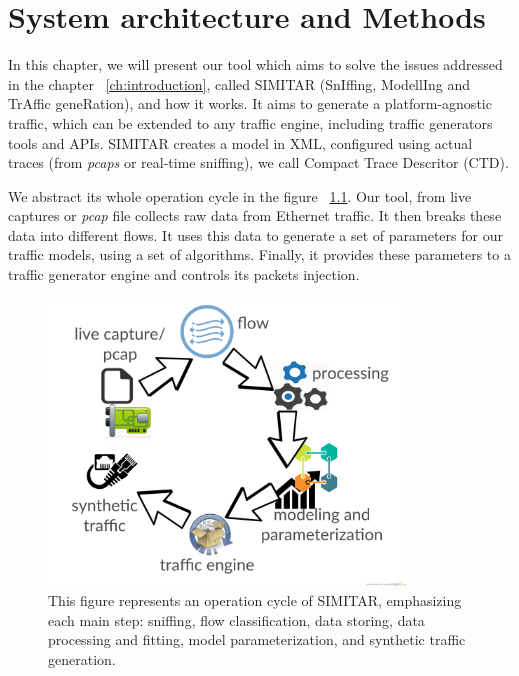 \chapter{System architecture and Methods}\label{ch:architecture}

In this chapter, we will present our tool which aims to solve the issues addressed in the chapter ~\ref{ch:introduction}, called SIMITAR (SnIffing, ModellIng and TrAffic geneRation), and how it works. It aims to generate a platform-agnostic traffic, which can be extended to any traffic engine, including traffic generators tools and APIs. SIMITAR creates a  model in XML, configured using actual traces (from \textit{pcaps} or real-time sniffing), we call Compact Trace Descritor (CTD). 



We abstract its whole operation cycle in the figure ~\ref{fig:cycle-of-operation}. Our tool, from live captures or \textit{pcap} file collects raw data from Ethernet traffic. It then breaks these data into different flows. It uses this data to generate a set of parameters for our traffic models, using a set of algorithms. Finally, it provides these parameters to a traffic generator engine and controls its packets injection.

\begin{figure}[ht!]
        \centering
        \includegraphics[height=3.0in]{figures/ch3/digram-project-cycle}
        \caption{This figure represents an operation cycle of SIMITAR, emphasizing each main step: sniffing, flow classification, data storing, data processing and fitting, model parameterization,  and synthetic traffic generation.}
    \label{fig:cycle-of-operation}
\end{figure}


